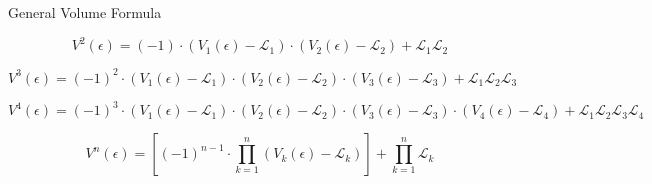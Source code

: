 \documentclass{beamer}
\newcommand{\SL}{\mathcal{L}}
\begin{document}
\begin{frame}{General Volume Formula}

$$V^2(\epsilon)= (-1)\cdot(V_1(\epsilon)-\SL_1)\cdot(V_2(\epsilon)-\SL_2) + \SL_1\SL_2$$

$$ V^3(\epsilon) = (-1)^2\cdot(V_1(\epsilon)-\SL_1)\cdot(V_2(\epsilon)-\SL_2)\cdot(V_3(\epsilon)-\SL_3) + \SL_1\SL_2\SL_3$$

$$ V^4(\epsilon)= (-1)^3\cdot(V_1(\epsilon)-\SL_1)\cdot(V_2(\epsilon)-\SL_2)\cdot(V_3(\epsilon)-\SL_3)\cdot(V_4(\epsilon)-\SL_4) + \SL_1\SL_2\SL_3\SL_4$$

$$V^{n}(\epsilon) =\left[ (-1)^{n-1} \cdot \displaystyle \prod_{k = 1}^{n}(V_k(\epsilon)-\SL_k)\right] +\prod_{k = 1}^{n} \SL_k$$

\end{frame}
\end{document}

